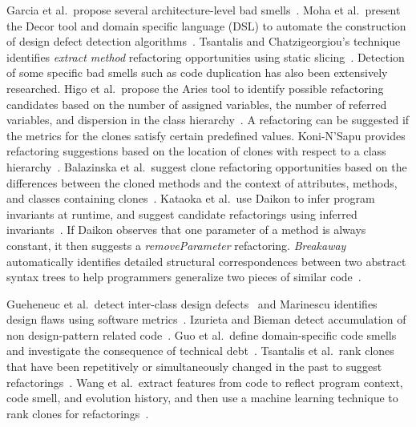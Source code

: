 Garcia et al.~propose several architecture-level bad smells~\cite{Garcia2009:badsmell}. Moha et al.~present the Decor tool and domain specific language (DSL) to automate the construction of design defect detection algorithms~\cite{Moha2009:designdefect}. 
Tsantalis and Chatzigeorgiou's technique identifies {\em extract method} refactoring opportunities using static slicing~\cite{Tsantalis2009:extractmethod}. Detection of some specific bad smells such as code duplication has also been extensively researched. Higo et al.~propose the Aries tool to identify possible refactoring candidates based on the number of assigned variables, the number of referred variables, and dispersion in the class hierarchy~\cite{Higo2004}. A refactoring can be suggested if the metrics for the clones satisfy certain predefined values. 
Koni-N'Sapu provides refactoring suggestions based on the location of clones with respect to a class hierarchy~\cite{koni_nsapu:ms01}. Balazinska et al.~suggest clone refactoring opportunities based on the differences between the cloned methods and the context of attributes, methods, and classes containing clones~\cite{Balazinska2000:ACA}. Kataoka et al.~use Daikon to infer program invariants at runtime, and suggest candidate refactorings using inferred invariants~\cite{Kataoka2001:ASP}. If Daikon observes that one parameter of a method is always constant, it then suggests a \emph{removeParameter} refactoring. {\it Breakaway} automatically identifies detailed structural correspondences between two abstract syntax trees to help programmers generalize two pieces of similar code~\cite{Cottrell:2007}. 

Gueheneuc et al.~detect inter-class design defects~\cite{Gueheneuc2001:designdefect} and Marinescu identifies design flaws using software metrics~\cite{Marinescu2004:designflaw}. Izurieta and Bieman detect accumulation of non design-pattern related code~\cite{Izurieta2007:grime}. Guo et al.~define domain-specific code smells~\cite{Guo2010:smell} and investigate the consequence of technical debt~\cite{Guo2011:td}. Tsantalis et al.~rank clones that have been repetitively or simultaneously changed in the past to suggest refactorings~\cite{Tsantalis2011:rankRefactoring}. Wang et al.~extract features from code to reflect program context, code smell, and evolution history, and then use a machine learning technique to rank clones for refactorings~\cite{Wang2014:recommendClones}.

